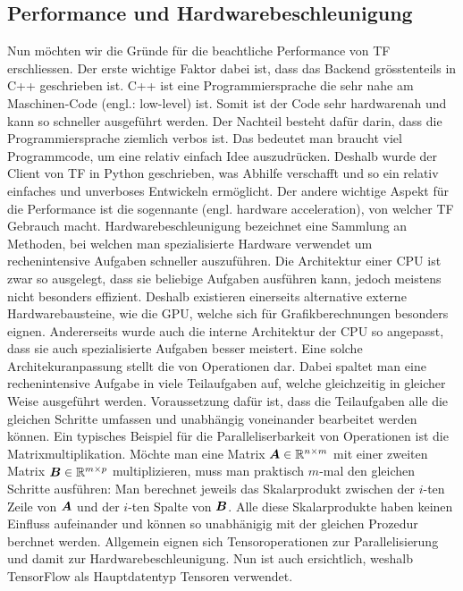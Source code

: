\begin{appendices}
\section*{Performance und Hardwarebeschleunigung}
Nun möchten wir die Gründe für die beachtliche Performance von TF erschliessen.
Der erste wichtige Faktor dabei ist, dass das Backend grösstenteils in C++
geschrieben ist. C++ ist eine Programmiersprache die sehr nahe am Maschinen-Code
(engl.: low-level) ist. Somit ist der Code sehr hardwarenah und kann so
schneller ausgeführt werden. Der Nachteil besteht dafür darin, dass die Programmiersprache
ziemlich verbos ist. Das bedeutet man braucht viel Programmcode, um eine relativ einfach Idee
auszudrücken. Deshalb wurde der Client von TF in Python geschrieben, was
Abhilfe verschafft und so ein relativ einfaches und unverboses Entwickeln ermöglicht.
\para{}
Der andere wichtige Aspekt für die Performance ist die sogennante
 (engl. hardware acceleration), von welcher TF
Gebrauch macht.
Hardwarebeschleunigung bezeichnet eine Sammlung an Methoden,
bei welchen man spezialisierte Hardware verwendet um rechenintensive Aufgaben
schneller auszuführen. Die Architektur einer CPU ist zwar so ausgelegt, dass
sie beliebige Aufgaben ausführen kann, jedoch meistens nicht besonders
effizient. Deshalb existieren einerseits alternative externe Hardwarebausteine, wie die
GPU, welche sich für Grafikberechnungen besonders eignen.
Andererseits wurde auch die interne Architektur der CPU so angepasst, dass sie
auch spezialisierte Aufgaben besser meistert.
\para{}
Eine solche Architekuranpassung stellt die
 von Operationen dar. Dabei spaltet man eine
rechenintensive Aufgabe in viele Teilaufgaben auf, welche gleichzeitig in
gleicher Weise ausgeführt werden. Voraussetzung dafür ist, dass die
Teilaufgaben alle die gleichen Schritte umfassen und unabhängig voneinander bearbeitet werden können.
Ein typisches Beispiel für die Paralleliserbarkeit von Operationen ist die
Matrixmultiplikation. Möchte man eine Matrix $\bm{A} \in \mathbb{R}^{n \times m}$ mit
einer zweiten Matrix $\bm{B} \in \mathbb{R}^{m \times p}$ multiplizieren, muss man
praktisch $m$-mal den gleichen Schritte ausführen: Man berechnet jeweils das
Skalarprodukt zwischen der $i$-ten Zeile von $\bm{A}$ und der $i$-ten Spalte
von $\bm{B}$. Alle diese Skalarprodukte haben keinen Einfluss aufeinander und
können so unabhänigig mit der gleichen Prozedur berchnet werden.
\para{}
Allgemein eignen sich Tensoroperationen zur Parallelisierung und damit zur Hardwarebeschleunigung.
Nun ist auch ersichtlich, weshalb TensorFlow als Hauptdatentyp Tensoren
verwendet.


\end{appendices}
